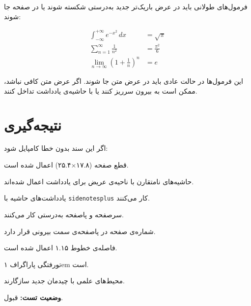\documentclass{matinbook}
\begin{document}
فرمول‌های طولانی باید در عرض باریک‌تر جدید به‌درستی شکسته
شوند یا در صفحه جا شوند:

\begin{align*}
    \int_{-\infty}^{+\infty} e^{-x^2} \, dx &= \sqrt{\pi} \\
    \sum_{n=1}^{\infty} \frac{1}{n^2} &= \frac{\pi^2}{6} \\
    \lim_{n \to \infty} \left(1 + \frac{1}{n}\right)^n &= e
\end{align*}

این فرمول‌ها در حالت عادی باید در عرض متن جا شوند. اگر
عرض متن کافی نباشد، ممکن است به بیرون سرریز کنند یا
با حاشیه‌ی یادداشت تداخل کنند.

\section{نتیجه‌گیری}
\label{sec:conclusion}

اگر این سند بدون خطا کامپایل شود:

قطع صفحه (۱۷.۸×۲۵.۴) اعمال شده است.

حاشیه‌های نامتقارن با ناحیه‌ی عریض برای یادداشت اعمال شده‌اند.

یادداشت‌های حاشیه با \texttt{sidenotesplus} کار می‌کنند.

سرصفحه و پاصفحه به‌درستی کار می‌کنند.

شماره‌ی صفحه در پاصفحه‌ی سمت بیرونی قرار دارد.

فاصله‌ی خطوط ۱.۱۵ اعمال شده است.

تورفتگی پاراگراف ۱em است.

محیط‌های علمی با چیدمان جدید سازگارند.

\textbf{وضعیت تست:} قبول.
\end{document}
